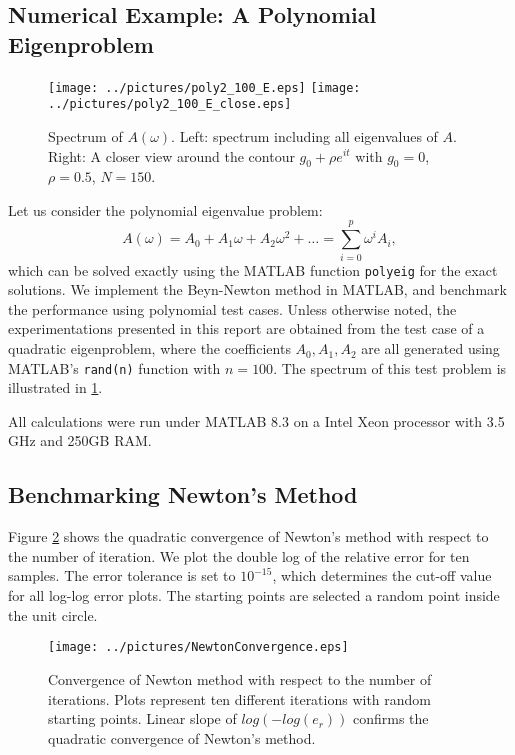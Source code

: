 \documentclass[11pt,letterpaper]{article}
\begin{document}
\subsection{Numerical Example: A Polynomial Eigenproblem}
\begin{figure}
\label{fig:E}
\begin{center}
\texttt{[image: ../pictures/poly2\_100\_E.eps]}
\texttt{[image: ../pictures/poly2\_100\_E\_close.eps]}
\end{center}
\caption{Spectrum of $A(\omega)$. \textnormal{Left: spectrum including all eigenvalues of $A$. Right: A closer view around the contour $g_0+\rho e^{it}$ with $g_0=0$, $\rho=0.5$, $N=150$.}}
\end{figure}

Let us consider the polynomial eigenvalue problem:
\begin{equation}
\label{eq:polyeig}
A(\omega)= A_0+A_1 \omega + A_2 \omega^2 + \ldots =\sum\limits_{i=0}^{p}\omega^iA_i ,
\end{equation}
which can be solved exactly using the MATLAB function {\tt polyeig} for the exact solutions. We implement the Beyn-Newton method in MATLAB, and benchmark the performance using polynomial test cases. Unless otherwise noted, the experimentations presented in this report are obtained from the test case of a quadratic eigenproblem, where the coefficients $A_0, A_1, A_2$ are all generated using MATLAB's {\tt rand(n)} function with $n=100$. The spectrum of this test problem is illustrated in \ref{fig:E}. 

All calculations were run under MATLAB 8.3 on a Intel Xeon processor with 3.5 GHz and 250GB RAM. 
\subsection{Benchmarking Newton's Method}
Figure \ref{fig:NewtonBenchmark} shows the quadratic convergence of Newton's method with respect to the number of iteration. We plot the double log of the relative error for ten samples. The error tolerance is set to $10^{-15}$, which determines the cut-off value for all log-log error plots. The starting points are selected a random point inside the unit circle. 
\begin{figure}\label{fig:NewtonBenchmark}
\begin{center}
\texttt{[image: ../pictures/NewtonConvergence.eps]}
\end{center}
\caption{Convergence of Newton method with respect to the number of iterations. \textnormal{Plots represent ten different iterations with random starting points. Linear slope of $log(-log(e_r))$ confirms the quadratic convergence of Newton's method.}}
\end{figure}
\end{document}
